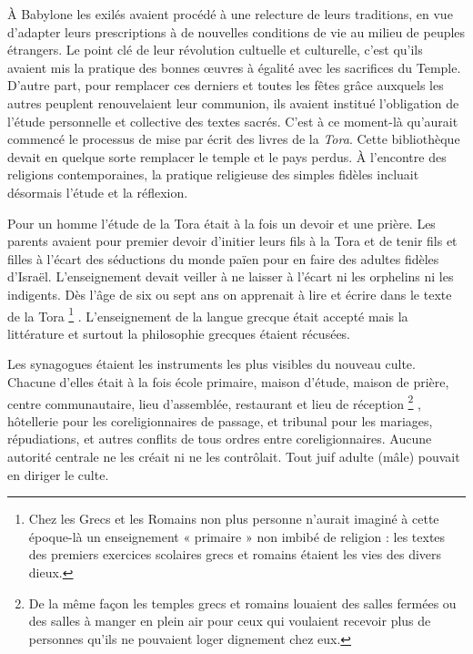  À Babylone les exilés avaient procédé à une relecture de leurs traditions, en vue d'adapter leurs prescriptions à de nouvelles conditions de vie au milieu de peuples étrangers. Le point clé de leur révolution cultuelle et culturelle, c'est qu'ils avaient mis la pratique des bonnes œuvres à égalité avec les sacrifices du Temple. D'autre part, pour remplacer ces derniers et toutes les fêtes grâce auxquels les autres peuplent renouvelaient leur communion, ils avaient institué l'obligation de l'étude personnelle et collective des textes sacrés. C'est à ce moment-là qu'aurait commencé le processus de mise par écrit des livres de la \emph{Tora}. Cette bibliothèque devait en quelque sorte remplacer le temple et le pays perdus. À l'encontre des religions contemporaines, la pratique religieuse des simples fidèles incluait désormais l'étude et la réflexion. 

 Pour un homme l'étude de la Tora était à la fois un devoir et une prière. Les parents avaient pour premier devoir d'initier leurs fils à la Tora et de tenir fils et filles à l'écart des séductions du monde païen pour en faire des adultes fidèles d'Israël. L'enseignement devait veiller à ne laisser à l'écart ni les orphelins ni les indigents. Dès l'âge de six ou sept ans on apprenait à lire et écrire dans le texte de la Tora%
\footnote{Chez les Grecs et les Romains non plus personne n'aurait imaginé à cette époque-là un enseignement « primaire » non imbibé de religion : les textes des premiers exercices scolaires grecs et romains étaient les vies des divers dieux.}%
. L'enseignement de la langue grecque était accepté mais la littérature et surtout la philosophie grecques étaient récusées. 

 Les synagogues étaient les instruments les plus visibles du nouveau culte. Chacune d'elles était à la fois école primaire, maison d'étude, maison de prière, centre communautaire, lieu d'assemblée, restaurant et lieu de réception%
\footnote{De la même façon les temples grecs et romains louaient des salles fermées ou des salles à manger en plein air pour ceux qui voulaient recevoir plus de personnes qu'ils ne pouvaient loger dignement chez eux.}%
, hôtellerie pour les coreligionnaires de passage, et tribunal pour les mariages, répudiations, et autres conflits de tous ordres entre coreligionnaires. Aucune autorité centrale ne les créait ni ne les contrôlait. Tout juif adulte (mâle) pouvait en diriger le culte.

